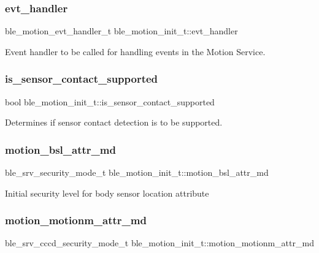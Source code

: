 \subsubsection{\texorpdfstring{evt\_handler}{evt\_handler}}
{\footnotesize\ttfamily ble\+\_\+motion\+\_\+evt\+\_\+handler\+\_\+t ble\+\_\+motion\+\_\+init\+\_\+t\+::evt\+\_\+handler}

Event handler to be called for handling events in the Motion Service. \mbox{\label{structble__motion__init__t_af686b9dc2dcb378cba8b706c568efe5b}} 
\subsubsection{\texorpdfstring{is\_sensor\_contact\_supported}{is\_sensor\_contact\_supported}}
{\footnotesize\ttfamily bool ble\+\_\+motion\+\_\+init\+\_\+t\+::is\+\_\+sensor\+\_\+contact\+\_\+supported}

Determines if sensor contact detection is to be supported. \mbox{\label{structble__motion__init__t_acdeec7610f03da5c0a0e2bc7252ab401}} 
\subsubsection{\texorpdfstring{motion\_bsl\_attr\_md}{motion\_bsl\_attr\_md}}
{\footnotesize\ttfamily ble\+\_\+srv\+\_\+security\+\_\+mode\+\_\+t ble\+\_\+motion\+\_\+init\+\_\+t\+::motion\+\_\+bsl\+\_\+attr\+\_\+md}

Initial security level for body sensor location attribute \mbox{\label{structble__motion__init__t_af03b60189a9fdd88ff02b82aa6e653e0}} 
\subsubsection{\texorpdfstring{motion\_motionm\_attr\_md}{motion\_motionm\_attr\_md}}
{\footnotesize\ttfamily ble\+\_\+srv\+\_\+cccd\+\_\+security\+\_\+mode\+\_\+t ble\+\_\+motion\+\_\+init\+\_\+t\+::motion\+\_\+motionm\+\_\+attr\+\_\+md}

